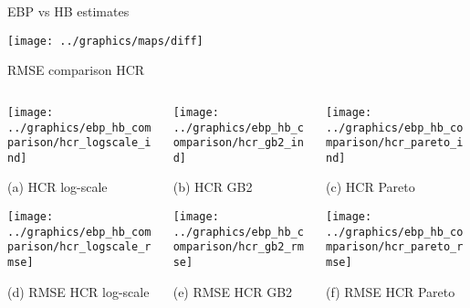 \begin{frame}{EBP vs HB estimates}
        \centering

        \texttt{[image: ../graphics/maps/diff]}

\end{frame}

\begin{frame}{RMSE comparison HCR}
    \begin{columns}
        \begin{column}{0.32\textwidth}
            \centering

            \texttt{[image: ../graphics/ebp\_hb\_comparison/hcr\_logscale\_ind]}

            \scriptsize{(a) HCR log-scale}

            \texttt{[image: ../graphics/ebp\_hb\_comparison/hcr\_logscale\_rmse]}

            \scriptsize{(d) RMSE HCR log-scale}

        \end{column}



        \begin{column}{0.32\textwidth}
            \centering
            \texttt{[image: ../graphics/ebp\_hb\_comparison/hcr\_gb2\_ind]}

            \scriptsize{(b) HCR GB2}

            \texttt{[image: ../graphics/ebp\_hb\_comparison/hcr\_gb2\_rmse]}

            \scriptsize{(e) RMSE HCR GB2}
        \end{column}

        \begin{column}{0.32\textwidth}
            \centering
            \texttt{[image: ../graphics/ebp\_hb\_comparison/hcr\_pareto\_ind]}

            \scriptsize{(c) HCR Pareto}

            \texttt{[image: ../graphics/ebp\_hb\_comparison/hcr\_pareto\_rmse]}

            \scriptsize{(f) RMSE HCR Pareto}
        \end{column}
    \end{columns}
\end{frame}

